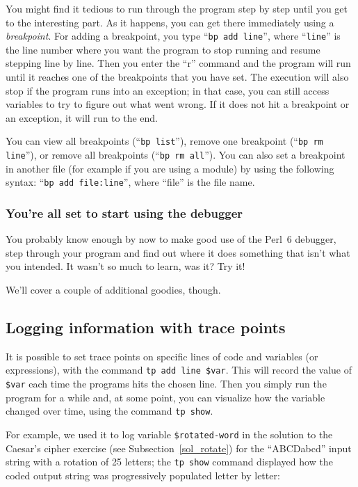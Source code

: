You might find it tedious to run through the program step 
by step until you get to the interesting part. As it happens, 
you can get there immediately using a \emph{breakpoint}. For 
adding a breakpoint, you type ``{\tt bp add line}'', where 
``{\tt line}'' 
is the line number where you want the program to stop running 
and resume stepping line by line. Then you enter the ``r'' 
command and the program will run until it reaches one of the 
breakpoints that you have set. The execution will also 
stop if the program runs into an exception; in that case, 
you can still access variables to try to figure out what went 
wrong. If it does not hit a breakpoint or an exception, it 
will run to the end.

You can view all breakpoints (``{\tt bp list}''), remove 
one breakpoint (``{\tt bp rm line}''), or remove all breakpoints 
(``{\tt bp rm all}''). You can also set a breakpoint in 
another file (for example if you are using a module) by 
using the following syntax: ``{\tt bp add file:line}'', where 
``file'' is the file name.

\subsubsection{You're all set to start using the debugger}

You probably know enough by now to make good use of the Perl~6 
debugger, step through your program and find out where it 
does something that isn't what you intended. It wasn't so 
much to learn, was it? Try it!

We'll cover a couple of additional goodies, though. 

\subsection{Logging information with trace points}

It is possible to set trace points on specific lines of code 
and variables (or expressions), with the command {\tt tp add 
line \$var}. This will record the value of \verb'$var' each 
time the programs hits the chosen line. Then you simply run 
the program for a while and, at some point, you can visualize 
how the variable changed over time, using the command 
{\tt tp show}.

For example, we used it to log variable \verb'$rotated-word' 
in the solution to the Caesar's cipher exercise 
(see Subsection~\ref{sol_rotate}) for the 
``ABCDabcd'' input string with a rotation of 25 letters; 
the {\tt tp show} command displayed how the coded output 
string was progressively populated letter by letter:

